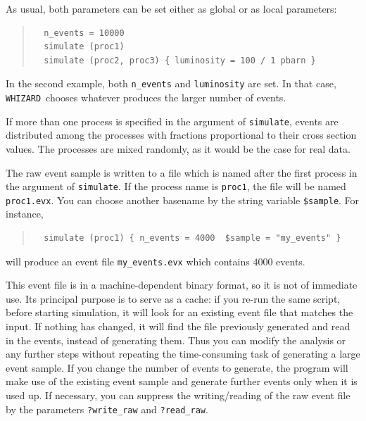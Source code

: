 \documentclass[12pt]{book}
\newcommand{\ttt}[1]{\texttt{#1}}
\newcommand{\whizard}{\ttt{WHIZARD}}
\begin{document}
As usual, both parameters can be set either as global or as local parameters:
\begin{quote}
\begin{footnotesize}
\begin{verbatim}
  n_events = 10000
  simulate (proc1)
  simulate (proc2, proc3) { luminosity = 100 / 1 pbarn }
\end{verbatim}
\end{footnotesize}
\end{quote}
In the second example, both \verb|n_events| and \verb|luminosity| are set.
In that case, \whizard\ chooses whatever produces the larger number of events.

If more than one process is specified in the argument of \ttt{simulate},
events are distributed among the processes with fractions proportional to
their cross section values.  The processes are mixed randomly, as it would be
the case for real data.

The raw event sample is written to a file which is named after the first process
in the argument of \ttt{simulate}.  If the process name is \ttt{proc1}, the
file will be named \ttt{proc1.evx}.  You can choose another basename by the
string variable \verb|$sample|.  For instance,
\begin{quote}
\begin{footnotesize}
\begin{verbatim}
  simulate (proc1) { n_events = 4000  $sample = "my_events" }
\end{verbatim}
\end{footnotesize}
\end{quote}
will produce an event file \verb|my_events.evx| which contains $4000$ events.

This event file is in a machine-dependent binary format, so it is not of
immediate use.  Its principal purpose is to serve as a cache: if you re-run
the same script, before starting simulation, it will look for an existing
event file that matches the input.  If nothing has changed, it will find the
file previously generated and read in the events, instead of generating them.
Thus you can modify the analysis or any further steps without repeating the
time-consuming task of generating a large event sample.  If you change the
number of events to generate, the program will make use of the existing event
sample and generate further events only when it is used up.  If necessary, you
can suppress the writing/reading of the raw event file by the parameters
\verb|?write_raw| and \verb|?read_raw|.
\end{document}
